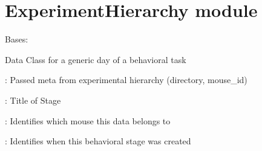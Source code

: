 \documentclass[letterpaper,10pt,english]{sphinxmanual}
\begin{document}
\sphinxstepscope


\section{ExperimentHierarchy module}
\label{\detokenize{ExperimentHierarchy:module-ExperimentHierarchy}}\label{\detokenize{ExperimentHierarchy:experimenthierarchy-module}}\label{\detokenize{ExperimentHierarchy::doc}}

\begin{fulllineitems}
\label{\detokenize{ExperimentHierarchy:ExperimentHierarchy.BehavioralStage}}
\pysigstartsignatures
{}
\pysigstopsignatures
\sphinxAtStartPar
Bases: {\hyperref[\detokenize{ExperimentHierarchy:ExperimentHierarchy.ExperimentStage}]{}}

\sphinxAtStartPar
Data Class for a generic day of a behavioral task
\begin{description}
\begin{DUlineblock}{0em}
\item[]  : Passed meta from experimental hierarchy (directory, mouse\_id)
\item[]  : Title of Stage
\end{DUlineblock}

\begin{DUlineblock}{0em}
\item[]  : Identifies which mouse this data belongs to
\item[]  : Identifies when this behavioral stage was created
\end{DUlineblock}


\end{description}
\end{fulllineitems}
\end{document}
